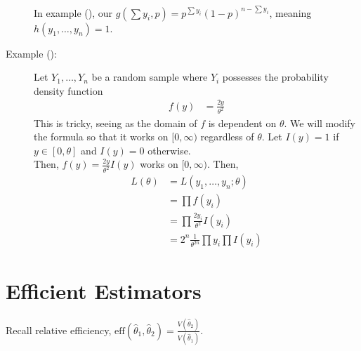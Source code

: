 \documentclass[10pt]{extarticle}
\begin{document}
\begin{description}
      In example (\textasteriskcentered), our $g(\sum y_i,p) = p^{\sum y_i}(1-p)^{n-\sum y_i}$, meaning $h(y_1,\dots,y_n) = 1$. 
    \item[Example (\textasteriskcentered\textasteriskcentered):] Let $Y_1,\dots,Y_n$ be a random sample where $Y_i$ possesses the probability density function
      \begin{align*}
        f(y) &= \frac{2y}{\theta^2} \tag*{on $[0,\theta]$.}
      \end{align*}
      This is tricky, seeing as the domain of $f$ is dependent on $\theta$. We will modify the formula so that it works on $[0,\infty)$ regardless of $\theta$. Let $I(y) = 1$ if $y \in [0,\theta]$ and $I(y) = 0$ otherwise.\\

      Then, $f(y) = \frac{2y}{\theta^2}I(y)$ works on $[0,\infty)$. Then,
      \begin{align*}
        L(\theta) &= L(y_1,\dots,y_n;\theta)\\
                  &= \prod f(y_i)\\
                  &= \prod \frac{2y_i}{\theta^2}I(y_i)\\
                  &= 2^{n}\frac{1}{\theta^{2n}} \prod y_i \prod I(y_i)
      \end{align*}
  \end{description}
  \section{Efficient Estimators}%
  Recall relative efficiency, $\text{eff}(\hat{\theta}_1,\hat{\theta}_2) = \frac{V(\hat{\theta}_2)}{V(\hat{\theta}_1)}$.\\
\end{document}

